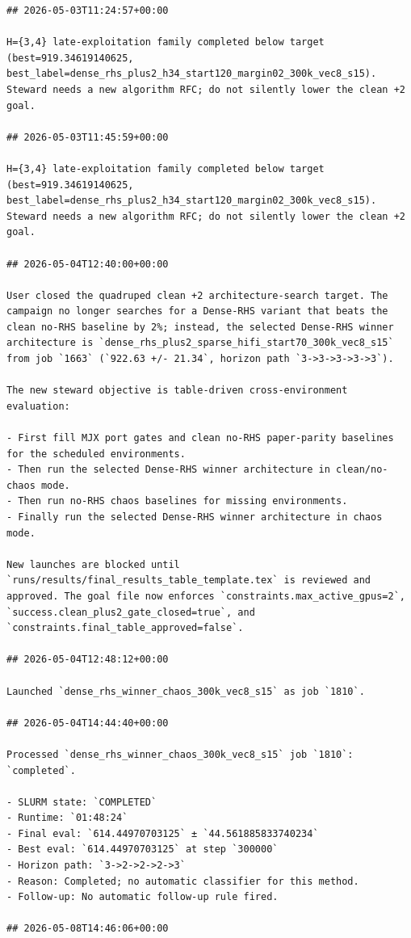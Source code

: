 \begin{verbatim}
## 2026-05-03T11:24:57+00:00

H={3,4} late-exploitation family completed below target (best=919.34619140625, best_label=dense_rhs_plus2_h34_start120_margin02_300k_vec8_s15). Steward needs a new algorithm RFC; do not silently lower the clean +2 goal.

## 2026-05-03T11:45:59+00:00

H={3,4} late-exploitation family completed below target (best=919.34619140625, best_label=dense_rhs_plus2_h34_start120_margin02_300k_vec8_s15). Steward needs a new algorithm RFC; do not silently lower the clean +2 goal.

## 2026-05-04T12:40:00+00:00

User closed the quadruped clean +2 architecture-search target. The campaign no longer searches for a Dense-RHS variant that beats the clean no-RHS baseline by 2%; instead, the selected Dense-RHS winner architecture is `dense_rhs_plus2_sparse_hifi_start70_300k_vec8_s15` from job `1663` (`922.63 +/- 21.34`, horizon path `3->3->3->3->3`).

The new steward objective is table-driven cross-environment evaluation:

- First fill MJX port gates and clean no-RHS paper-parity baselines for the scheduled environments.
- Then run the selected Dense-RHS winner architecture in clean/no-chaos mode.
- Then run no-RHS chaos baselines for missing environments.
- Finally run the selected Dense-RHS winner architecture in chaos mode.

New launches are blocked until `runs/results/final_results_table_template.tex` is reviewed and approved. The goal file now enforces `constraints.max_active_gpus=2`, `success.clean_plus2_gate_closed=true`, and `constraints.final_table_approved=false`.

## 2026-05-04T12:48:12+00:00

Launched `dense_rhs_winner_chaos_300k_vec8_s15` as job `1810`.

## 2026-05-04T14:44:40+00:00

Processed `dense_rhs_winner_chaos_300k_vec8_s15` job `1810`: `completed`.

- SLURM state: `COMPLETED`
- Runtime: `01:48:24`
- Final eval: `614.44970703125` ± `44.561885833740234`
- Best eval: `614.44970703125` at step `300000`
- Horizon path: `3->2->2->2->3`
- Reason: Completed; no automatic classifier for this method.
- Follow-up: No automatic follow-up rule fired.

## 2026-05-08T14:46:06+00:00


\end{verbatim}
